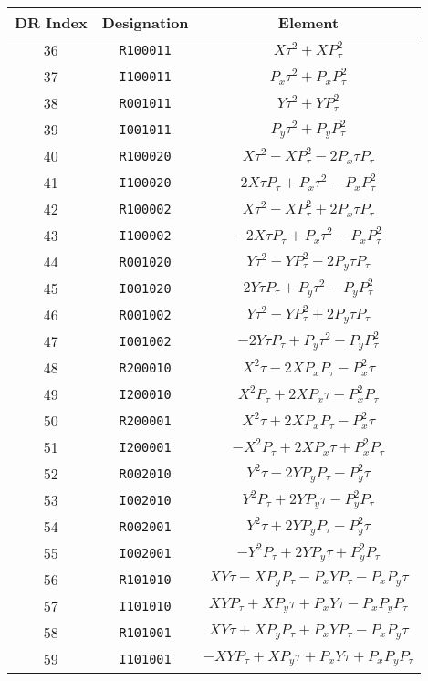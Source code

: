 {{\begin{center}
\newpage
\begin{tabular}{ccc}
DR Index&Designation&Element\\ \hline
   36&{\tt R100011}&$X{\tau}^{2}+XP_{\tau}^{2}$\\
   37&{\tt I100011}&$P_x{\tau}^{2}+P_xP_{\tau}^{2}$\\
   38&{\tt R001011}&$Y{\tau}^{2}+YP_{\tau}^{2}$\\
   39&{\tt I001011}&$P_y{\tau}^{2}+P_yP_{\tau}^{2}$\\
   40&{\tt R100020}&$X{\tau}^{2}-XP_{\tau}^{2}-2P_x{\tau}P_{\tau}$\\
   41&{\tt I100020}&$2X{\tau}P_{\tau}+P_x{\tau}^{2}-P_xP_{\tau}^{2}$\\
   42&{\tt R100002}&$X{\tau}^{2}-XP_{\tau}^{2}+2P_x{\tau}P_{\tau}$\\
   43&{\tt I100002}&$-2X{\tau}P_{\tau}+P_x{\tau}^{2}-P_xP_{\tau}^{2}$\\
   44&{\tt R001020}&$Y{\tau}^{2}-YP_{\tau}^{2}-2P_y{\tau}P_{\tau}$\\
   45&{\tt I001020}&$2Y{\tau}P_{\tau}+P_y{\tau}^{2}-P_yP_{\tau}^{2}$\\
   46&{\tt R001002}&$Y{\tau}^{2}-YP_{\tau}^{2}+2P_y{\tau}P_{\tau}$\\
   47&{\tt I001002}&$-2Y{\tau}P_{\tau}+P_y{\tau}^{2}-P_yP_{\tau}^{2}$\\
   48&{\tt R200010}&$X^{2}{\tau}-2XP_xP_{\tau}-P_x^{2}{\tau}$\\
   49&{\tt I200010}&$X^{2}P_{\tau}+2XP_x{\tau}-P_x^{2}P_{\tau}$\\
   50&{\tt R200001}&$X^{2}{\tau}+2XP_xP_{\tau}-P_x^{2}{\tau}$\\
   51&{\tt I200001}&$-X^{2}P_{\tau}+2XP_x{\tau}+P_x^{2}P_{\tau}$\\
   52&{\tt R002010}&$Y^{2}{\tau}-2YP_yP_{\tau}-P_y^{2}{\tau}$\\
   53&{\tt I002010}&$Y^{2}P_{\tau}+2YP_y{\tau}-P_y^{2}P_{\tau}$\\
   54&{\tt R002001}&$Y^{2}{\tau}+2YP_yP_{\tau}-P_y^{2}{\tau}$\\
   55&{\tt I002001}&$-Y^{2}P_{\tau}+2YP_y{\tau}+P_y^{2}P_{\tau}$\\
   56&{\tt R101010}&$XY{\tau}-XP_yP_{\tau}-P_xYP_{\tau}-P_xP_y{\tau}$\\
   57&{\tt I101010}&$XYP_{\tau}+XP_y{\tau}+P_xY{\tau}-P_xP_yP_{\tau}$\\
   58&{\tt R101001}&$XY{\tau}+XP_yP_{\tau}+P_xYP_{\tau}-P_xP_y{\tau}$\\
   59&{\tt I101001}&$-XYP_{\tau}+XP_y{\tau}+P_xY{\tau}+P_xP_yP_{\tau}$\\

\end{tabular}
\end{center}}}
